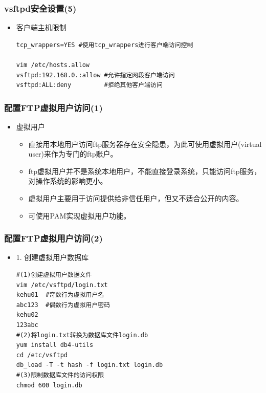 \documentclass[xcolor=svgnames,presentation]{beamer}
\begin{document}
\begin{frame}[fragile]
\frametitle{vsftpd安全设置(5)}
\label{sec-3-13}
\begin{itemize}

\item 客户端主机限制\\
\label{sec-3-13-1}%
\begin{verbatim}
tcp_wrappers=YES #使用tcp_wrappers进行客户端访问控制

vim /etc/hosts.allow
vsftpd:192.168.0.:allow #允许指定网段客户端访问
vsftpd:ALL:deny         #拒绝其他客户端访问
\end{verbatim}
\end{itemize} %
\end{frame}
\begin{frame}
\frametitle{配置FTP虚拟用户访问(1)}
\label{sec-3-14}
\begin{itemize}

\item 虚拟用户
\label{sec-3-14-1}%
\begin{itemize}

\item 直接用本地用户访问ftp服务器存在安全隐患，为此可使用虚拟用户(virtual user)来作为专门的ftp账户。
\label{sec-3-14-1-1}%

\item ftp虚拟用户并不是系统本地用户，不能直接登录系统，只能访问ftp服务，对操作系统的影响更小。
\label{sec-3-14-1-2}%

\item 虚拟用户主要用于访问提供给非信任用户，但又不适合公开的内容。
\label{sec-3-14-1-3}%

\item 可使用PAM实现虚拟用户功能。
\label{sec-3-14-1-4}%
\end{itemize} %
\end{itemize} %
\end{frame}
\begin{frame}[fragile]
\frametitle{配置FTP虚拟用户访问(2)}
\label{sec-3-15}
\begin{itemize}

\item 1. 创建虚拟用户数据库\\
\label{sec-3-15-1}%
\begin{verbatim}
#(1)创建虚拟用户数据文件
vim /etc/vsftpd/login.txt
kehu01  #奇数行为虚拟用户名
abc123  #偶数行为虚拟用户密码
kehu02
123abc
#(2)将login.txt转换为数据库文件login.db
yum install db4-utils
cd /etc/vsftpd
db_load -T -t hash -f login.txt login.db
#(3)限制数据库文件的访问权限
chmod 600 login.db
\end{verbatim}
\end{itemize} %
\end{frame}
\end{document}
